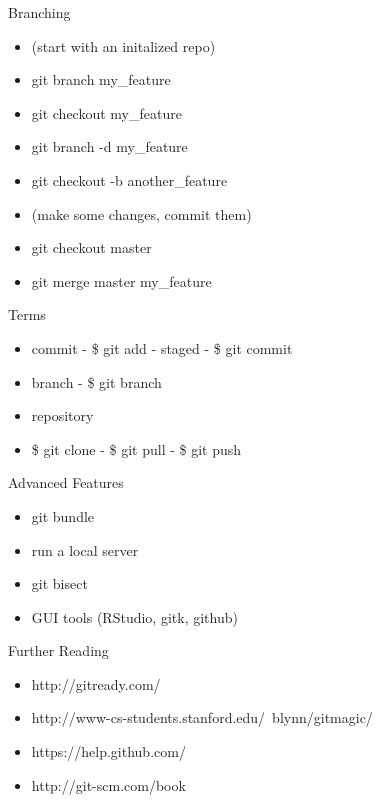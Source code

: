 \documentclass{beamer}
\begin{document}
\begin{frame}{Branching}
  \begin{center}
    \begin{itemize}
      \item (start with an initalized repo)
      \item git branch my\_feature
      \item git checkout my\_feature
      \item git branch -d my\_feature
      \item git checkout -b another\_feature
      \item (make some changes, commit them)
      \item git checkout master
      \item git merge master my\_feature
    \end{itemize}
  \end{center}
\end{frame}

\begin{frame}{Terms}
  \begin{center}
    \begin{itemize}
      \item commit - \$ git add - staged - \$ git commit
      \item branch - \$ git branch
      \item repository
      \item \$ git clone - \$ git pull - \$ git push
    \end{itemize}
  \end{center}
\end{frame}

\begin{frame}{Advanced Features}
  \begin{center}
    \begin{itemize}
    \item git bundle
    \item run a local server
    \item git bisect
    \item GUI tools (RStudio, gitk, github)
    \end{itemize}
  \end{center}
\end{frame}

\begin{frame}{Further Reading}
  \begin{center}
    \begin{itemize}
      \item http://gitready.com/
      \item http://www-cs-students.stanford.edu/~blynn/gitmagic/
      \item https://help.github.com/
      \item http://git-scm.com/book
    \end{itemize}
  \end{center}
\end{frame}
\end{document}
